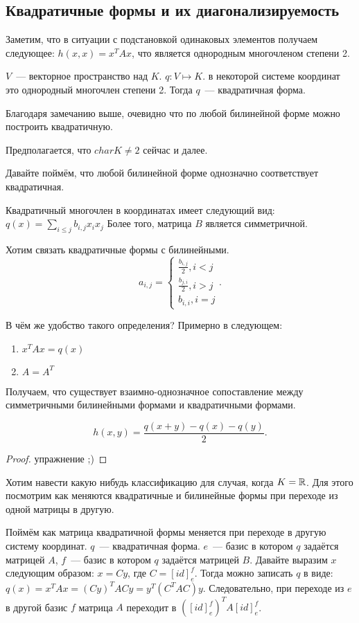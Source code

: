 \subsection{Квадратичные формы и их диагонализируемость}
\begin{remark}
    Заметим, что в ситуации с подстановкой одинаковых элементов получаем следующее:
    $h(x,x) = x^TAx$, что является однородным многочленом степени 2.
\end{remark}
\begin{definition}
    $V$~--- векторное пространство над $K$. $q\colon V\mapsto K$. 
    в некоторой системе координат это однородный многочлен степени 2.
    Тогда $q$~--- квадратичная форма.
\end{definition}
Благодаря замечанию выше, очевидно что по любой билинейной форме можно построить
квадратичную.
\begin{remark}
    Предполагается, что $char K \not= 2$ сейчас и далее.
\end{remark}
Давайте поймём, что любой билинейной форме однозначно соответствует квадратичная.
\begin{remark}
    Квадратичный многочлен в координатах имеет следующий вид:
    $q(x) = \sum\limits_{i\le j}^{}{b_{i,j} x_i x_j}$
    Более того, матрица $B$ является симметричной.
\end{remark}
Хотим связать квадратичные формы с билинейными.
 \[
 a_{i,j} = 
 \begin{cases}
     \frac{b_{i,j}}{2}, i < j\\
     \frac{b_{j,i}}{2}, i > j\\
     b_{i,i}, i = j
 \end{cases}
.\] 

В чём же удобство такого определения? Примерно в следующем:
\begin{enumerate}
    \item
        $x^TAx = q(x)$
    \item
         $A = A^T$
\end{enumerate}
Получаем, что существует взаимно-однозначное сопоставление между
симметричными билинейными формами и квадратичными формами.

\begin{statement}
     \[
			 h(x, y) = \frac{q(x + y) - q(x) - q(y)}{2}
    .\] 
\end{statement}
\begin{proof}
    упражнение ;)
\end{proof}
\begin{motivation}
    Хотим навести какую нибудь классификацию для случая, когда $K = \mathbb{R}$.
    Для этого посмотрим как меняются квадратичные и билинейные формы при переходе из одной матрицы в другую.
\end{motivation}
Поймём как матрица квадратичной формы меняется при переходе в другую систему координат.
$q$~--- квадратичная форма. $e$~--- базис в котором $q$ задаётся матрицей $A$,
$f$~--- базис в котором $q$ задаётся матрицей $B$.
Давайте выразим $x$ следующим образом: $x = Cy$, где $C = [id]^f_e$.
Тогда можно записать $q$ в виде: $q(x) = x^T A x = (Cy)^T AC y = y^T (C^TAC) y$.
Следовательно, при переходе из $e$ в другой базис $f$ матрица $A$ переходит в $([id]^f_e)^T A [id]^f_e$.

